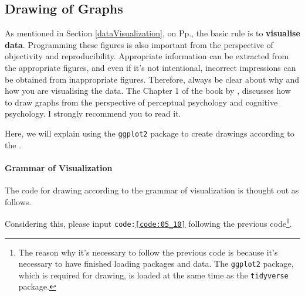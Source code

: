\documentclass{ltjsbook}
\begin{document}
\subsection{Drawing of Graphs}
As mentioned in Section \ref{dataVisualization}, on Pp.\pageref{dataVisualization}, the basic rule is to \textbf{visualise data}. Programming these figures is also important from the perspective of objectivity and reproducibility. Appropriate information can be extracted from the appropriate figures, and even if it's not intentional, incorrect impressions can be obtained from inappropriate figures. Therefore, always be clear about why and how you are visualising the data. The Chapter 1 of the book by \textcite{Kieran2018}, discusses how to draw graphs from the perspective of perceptual psychology and cognitive psychology. I strongly recommend you to read it.

Here, we will explain using the \texttt{ggplot2} package\parencite{ggplot2} to create drawings according to the .
\paragraph{Grammar of Visualization}
The code for drawing according to the grammar of visualization is thought out as follows.

Considering this, please input \texttt{code:\ref{code:05_10}} following the previous code\footnote{The reason why it's necessary to follow the previous code is because it's necessary to have finished loading packages and data. The \texttt{ggplot2} package, which is required for drawing, is loaded at the same time as the \texttt{tidyverse} package.}.
\end{document}
